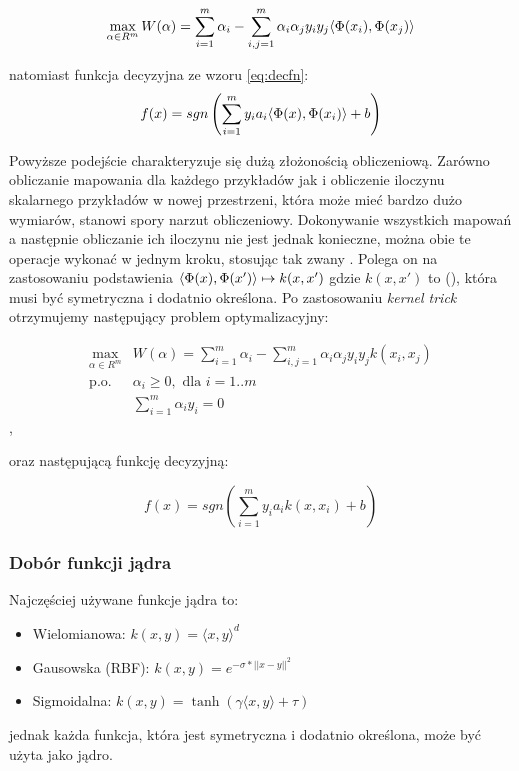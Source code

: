 \begin{equation}
\max\limits_{\alpha \in R^m}  W(\alpha) = \sum_{i=1}^{m} \alpha_i - \sum_{i,j=1}^{m} \alpha_i \alpha_j y_i y_j \langle \Phi(x_i), \Phi(x_j) \rangle
\label{eq:dual-k-target}
\end{equation}

natomiast funkcja decyzyjna ze wzoru \ref{eq:decfn}:
\begin{equation}
f(x) = sgn \left( \sum_{i=1}^{m} y_i a_i \langle \Phi(x), \Phi(x_i) \rangle + b \right)
\end{equation}

\FloatBarrier

Powyższe podejście charakteryzuje się dużą złożonością obliczeniową. Zarówno obliczanie mapowania dla każdego przykładów jak i obliczenie iloczynu skalarnego przykładów w nowej przestrzeni, która może mieć bardzo dużo wymiarów, stanowi spory narzut obliczeniowy. Dokonywanie wszystkich mapowań a następnie obliczanie ich iloczynu nie jest jednak konieczne, można obie te operacje wykonać w jednym kroku, stosując tak zwany  \cite{Boser:1992:TAO:130385.130401}. Polega on na zastosowaniu podstawienia $ \langle \Phi(x), \Phi(x') \rangle \mapsto k(x, x') $ gdzie $ k(x,x') $ to  (), która musi być symetryczna i dodatnio określona. Po zastosowaniu \emph{kernel trick} otrzymujemy następujący problem optymalizacyjny:

\begin{equation}
\begin{array}{ll}
\max\limits_{\alpha \in R^m} & W(\alpha) = \sum_{i=1}^{m} \alpha_i - \sum_{i,j=1}^{m} \alpha_i \alpha_j y_i y_j k(x_i, x_j) \\
\text{p.o.} &  \alpha_i \geq 0 , \text{ dla } i=1..m \\
& \sum_{i=1}^{m} \alpha_i y_i = 0
\end{array}
\label{eq:dual-k}
\end{equation},

oraz następującą funkcję decyzyjną: 

\begin{equation}
f(x) = sgn \left( \sum_{i=1}^{m} y_i a_i k(x, x_i) + b \right)
\label{eq:decfn-k}
\end{equation}

\subsubsection{Dobór funkcji jądra}

Najczęściej używane funkcje jądra to:	
\begin{itemize}
	\item Wielomianowa: $ k(x, y) = \langle x,y \rangle ^d $
	\item Gausowska (RBF): $k(x, y) =  e^{-\sigma*||x-y||^2} $	
	\item Sigmoidalna: $ k(x, y) = \tanh(\gamma \langle x,y \rangle + \tau) $
\end{itemize}
jednak każda funkcja, która jest symetryczna i dodatnio określona, może być użyta jako jądro.



